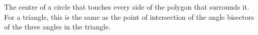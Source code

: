 The centre of a circle that touches every side of the polygon that 
surrounds it. For a triangle, this is the same as the point of intersection 
of the angle bisectors of the three angles in the triangle.